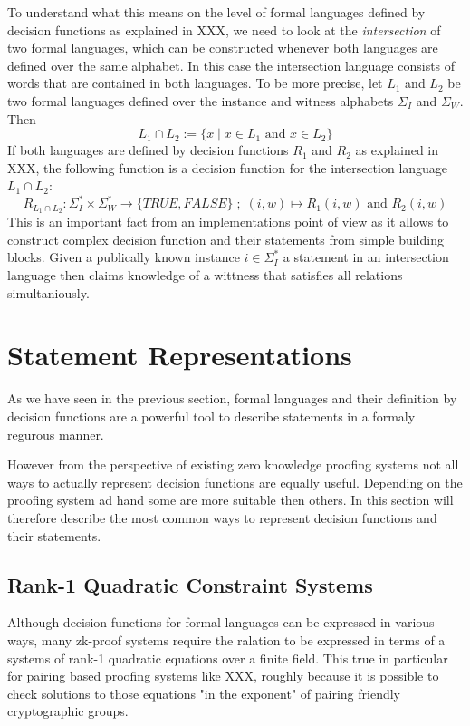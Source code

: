 To understand what this means on the level of formal languages defined by decision functions as explained in XXX, we need to look at the \textit{intersection} of two formal languages, which can be constructed whenever both languages are defined over the same alphabet. In this case the intersection language consists of words that are contained in both languages. To be more precise, let $L_1$ and $L_2$ be two formal languages defined over the instance and witness alphabets $\Sigma_I$ and $\Sigma_W$. Then
\begin{equation}
L_1 \cap L_2 := \{x\;|\; x\in L_1 \text{ and } x\in L_2\}
\end{equation} 
If both languages are defined by decision functions $R_1$ and $R_2$ as explained in XXX, the following function is a decision function for the intersection language $L_1 \cap L_2$:
\begin{equation}
R_{L_1 \cap L_2}: \Sigma_I^* \times \Sigma_W^* \to \{TRUE, FALSE\}\;;\;
(i,w) \mapsto R_1(i,w) \text{ and } R_2(i,w)
\end{equation}
This is an important fact from an implementations point of view as it allows to construct complex decision function and their statements from simple building blocks. Given a publically known instance $i\in \Sigma_I^*$ a statement in an intersection language then claims knowledge of a wittness that satisfies all relations simultaniously.

\section{Statement Representations} 

As we have seen in the previous section, formal languages and their definition by decision functions are a powerful tool to describe statements in a formaly regurous manner. 

However from the perspective of existing zero knowledge proofing systems not all ways to actually represent decision functions are equally useful. Depending on the proofing system ad hand some are more suitable then others. In this section will therefore describe the most common ways to represent decision functions and their statements.
\subsection{Rank-1 Quadratic Constraint Systems}
Although decision functions for formal languages can be expressed in various ways, many zk-proof systems require the ralation to be expressed in terms of a systems of rank-1 quadratic equations over a finite field. This true in particular for pairing based proofing systems like XXX, roughly because it is possible to check solutions to those equations "in the exponent" of pairing friendly cryptographic groups. 

